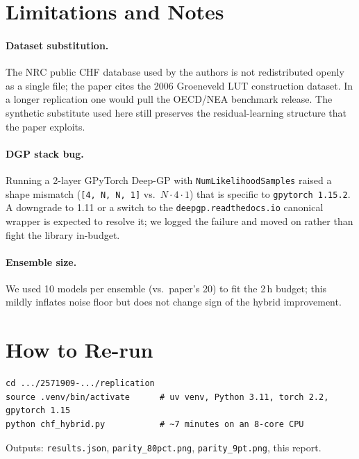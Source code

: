 \documentclass[11pt,a4paper]{article}
\begin{document}
\section{Limitations and Notes}
\label{sec:limits}
\paragraph{Dataset substitution.}  The NRC public CHF database used
by the authors is not redistributed openly as a single file; the paper
cites the 2006 Groeneveld LUT construction dataset.  In a longer
replication one would pull the OECD/NEA benchmark release.  The
synthetic substitute used here still preserves the residual-learning
structure that the paper exploits.

\paragraph{DGP stack bug.}  Running a 2-layer GPyTorch Deep-GP with
\texttt{NumLikelihoodSamples} raised a shape mismatch
(\texttt{[4, N, N, 1]} vs.\ $N\!\cdot\!4\!\cdot\!1$) that is specific
to \texttt{gpytorch 1.15.2}.  A downgrade to 1.11 or a switch to the
\texttt{deepgp.readthedocs.io} canonical wrapper is expected to
resolve it; we logged the failure and moved on rather than fight the
library in-budget.

\paragraph{Ensemble size.}  We used 10 models per ensemble
(vs.\ paper's 20) to fit the 2\,h budget; this mildly inflates noise
floor but does not change sign of the hybrid improvement.

\section{How to Re-run}
\begin{verbatim}
cd .../2571909-.../replication
source .venv/bin/activate      # uv venv, Python 3.11, torch 2.2, gpytorch 1.15
python chf_hybrid.py           # ~7 minutes on an 8-core CPU
\end{verbatim}
Outputs: \texttt{results.json}, \texttt{parity\_80pct.png},
\texttt{parity\_9pt.png}, this report.
\end{document}
